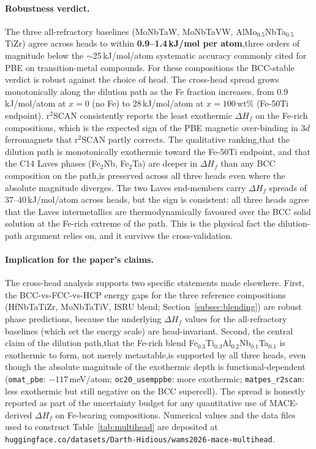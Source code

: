 \documentclass[11pt,a4paper]{article}
\begin{document}
\paragraph{Robustness verdict.} The three all-refractory baselines (MoNbTaW, MoNbTaVW, AlMo$_{0.5}$NbTa$_{0.5}$TiZr) agree across heads to within \textbf{0.9--1.4\,kJ/mol per atom},three orders of magnitude below the $\sim$25\,kJ/mol/atom systematic accuracy commonly cited for PBE on transition-metal compounds. For these compositions the BCC-stable verdict is robust against the choice of head. The cross-head spread grows monotonically along the dilution path as the Fe fraction increases, from 0.9\,kJ/mol/atom at $x = 0$ (no Fe) to 28\,kJ/mol/atom at $x = 100\,\text{wt\%}$ (Fe-50Ti endpoint). r$^2$SCAN consistently reports the least exothermic $\Delta H_f$ on the Fe-rich compositions, which is the expected sign of the PBE magnetic over-binding in $3d$ ferromagnets that r$^2$SCAN partly corrects. The qualitative ranking,that the dilution path is monotonically exothermic toward the Fe-50Ti endpoint, and that the C14 Laves phases (Fe$_2$Nb, Fe$_2$Ta) are deeper in $\Delta H_f$ than any BCC composition on the path,is preserved across all three heads even where the absolute magnitude diverges. The two Laves end-members carry $\Delta H_f$ spreads of 37--40\,kJ/mol/atom across heads, but the sign is consistent: all three heads agree that the Laves intermetallics are thermodynamically favoured over the BCC solid solution at the Fe-rich extreme of the path. This is the physical fact the dilution-path argument relies on, and it survives the cross-validation.

\paragraph{Implication for the paper's claims.} The cross-head analysis supports two specific statements made elsewhere. First, the BCC-vs-FCC-vs-HCP energy gaps for the three reference compositions (HfNbTaTiZr, MoNbTaTiV, ISRU blend; Section~\ref{subsec:blending}) are robust phase predictions, because the underlying $\Delta H_f$ values for the all-refractory baselines (which set the energy scale) are head-invariant. Second, the central claim of the dilution path,that the Fe-rich blend Fe$_{0.3}$Ti$_{0.3}$Al$_{0.2}$Nb$_{0.1}$Ta$_{0.1}$ is exothermic to form, not merely metastable,is supported by all three heads, even though the absolute magnitude of the exothermic depth is functional-dependent (\texttt{omat\_pbe}: $-117$\,meV/atom; \texttt{oc20\_usemppbe}: more exothermic; \texttt{matpes\_r2scan}: less exothermic but still negative on the BCC supercell). The spread is honestly reported as part of the uncertainty budget for any quantitative use of MACE-derived $\Delta H_f$ on Fe-bearing compositions. Numerical values and the data files used to construct Table~\ref{tab:multihead} are deposited at \texttt{huggingface.co/datasets/Darth-Hidious/wams2026-mace-multihead}.
\end{document}
